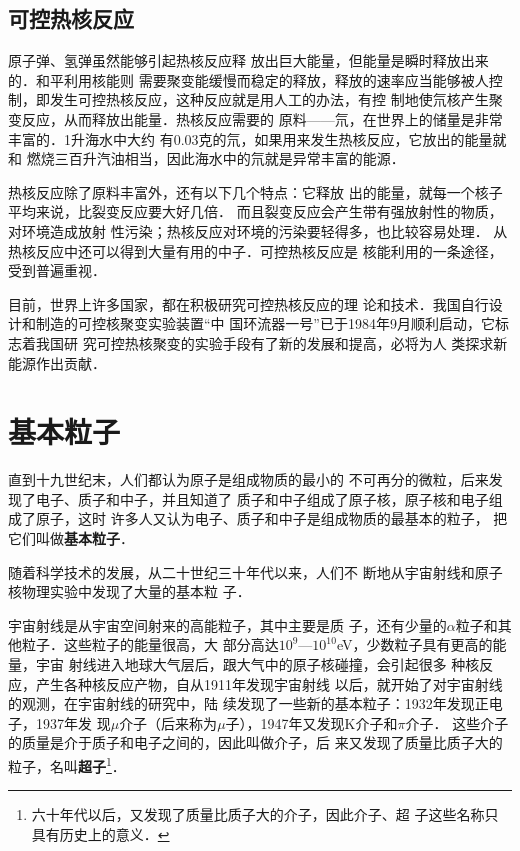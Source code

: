 \subsection{可控热核反应}

原子弹、氢弹虽然能够引起热核反应释
放出巨大能量，但能量是瞬时释放出来的．和平利用核能则
需要聚变能缓慢而稳定的释放，释放的速率应当能够被人控
制，即发生可控热核反应，这种反应就是用人工的办法，有控
制地使氘核产生聚变反应，从而释放出能量．热核反应需要的
原料——氘，在世界上的储量是非常丰富的．1升海水中大约
有0.03克的氘，如果用来发生热核反应，它放出的能量就和
燃烧三百升汽油相当，因此海水中的氘就是异常丰富的能源．

热核反应除了原料丰富外，还有以下几个特点：它释放
出的能量，就每一个核子平均来说，比裂变反应要大好几倍．
而且裂变反应会产生带有强放射性的物质，对环境造成放射
性污染；热核反应对环境的污染要轻得多，也比较容易处理．
从热核反应中还可以得到大量有用的中子．可控热核反应是
核能利用的一条途径，受到普遍重视．

目前，世界上许多国家，都在积极研究可控热核反应的理
论和技术．我国自行设计和制造的可控核聚变实验装置“中
国环流器一号”已于1984年9月顺利启动，它标志着我国研
究可控热核聚变的实验手段有了新的发展和提高，必将为人
类探求新能源作出贡献．

\section{基本粒子}

直到十九世纪末，人们都认为原子是组成物质的最小的
不可再分的微粒，后来发现了电子、质子和中子，并且知道了
质子和中子组成了原子核，原子核和电子组成了原子，这时
许多人又认为电子、质子和中子是组成物质的最基本的粒子，
把它们叫做\textbf{基本粒子}．

随着科学技术的发展，从二十世纪三十年代以来，人们不
断地从宇宙射线和原子核物理实验中发现了大量的基本粒
子．

宇宙射线是从宇宙空间射来的高能粒子，其中主要是质
子，还有少量的$\alpha$粒子和其他粒子．这些粒子的能量很高，大
部分高达$10^9$—$10^{10}$eV，少数粒子具有更高的能量，宇宙
射线进入地球大气层后，跟大气中的原子核碰撞，会引起很多
种核反应，产生各种核反应产物，自从1911年发现宇宙射线
以后，就开始了对宇宙射线的观测，在宇宙射线的研究中，陆
续发现了一些新的基本粒子：1932年发现正电子，1937年发
现$\mu$介子（后来称为$\mu$子），1947年又发现K介子和$\pi$介子．
这些介子的质量是介于质子和电子之间的，因此叫做介子，后
来又发现了质量比质子大的粒子，名叫\textbf{超子}\footnote{六十年代以后，又发现了质量比质子大的介子，因此介子、超
子这些名称只具有历史上的意义．}．


